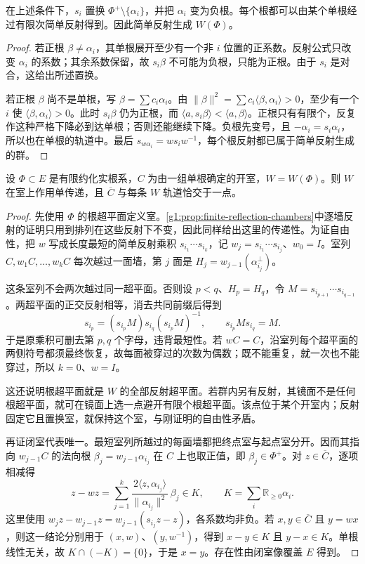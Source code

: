 \begin{lemma}\label{g1:lem:simple-reflection-positive-roots}
	在上述条件下，\(s_i\) 置换 \(\Phi^+\setminus\{\alpha_i\}\)，并把 \(\alpha_i\) 变为负根。每个根都可以由某个单根经过有限次简单反射得到。因此简单反射生成 \(W(\Phi)\)。
\end{lemma}
\begin{proof}
	若正根 \(\beta\ne\alpha_i\)，其单根展开至少有一个非 \(i\) 位置的正系数。反射公式只改变 \(\alpha_i\) 的系数；其余系数保留，故 \(s_i\beta\) 不可能为负根，只能为正根。由于 \(s_i\) 是对合，这给出所述置换。

	若正根 \(\beta\) 尚不是单根，写 \(\beta=\sum c_i\alpha_i\)。由
	\(\lVert\beta\rVert^2=\sum c_i\langle\beta,\alpha_i\rangle>0\)，至少有一个 \(i\) 使 \(\langle\beta,\alpha_i\rangle>0\)。此时 \(s_i\beta\) 仍为正根，而 \(\langle a,s_i\beta\rangle<\langle a,\beta\rangle\)。正根只有有限个，反复作这种严格下降必到达单根；否则还能继续下降。负根先变号，且 \(-\alpha_i=s_i\alpha_i\)，所以也在单根的轨道中。最后 \(s_{w\alpha_i}=ws_iw^{-1}\)，每个根反射都已属于简单反射生成的群。
\end{proof}

\begin{theorem}\label{g1:thm:reflection-chamber-fundamental}
	设 \(\Phi\subset E\) 是有限约化实根系，\(C\) 为由一组单根确定的开室，\(W=W(\Phi)\)。则 \(W\) 在室上作用单传递，且 \(\overline C\) 与每条 \(W\) 轨道恰交于一点。
\end{theorem}
\begin{proof}
	先使用 \(\Phi\) 的根超平面定义室。\cref{g1:prop:finite-reflection-chambers}中逐墙反射的证明只用到排列在这些反射下不变，因此同样给出这里的传递性。为证自由性，把 \(w\) 写成长度最短的简单反射乘积 \(s_{i_1}\cdots s_{i_k}\)，记 \(w_j=s_{i_1}\cdots s_{i_j}\)、\(w_0=I\)。室列 \(C,w_1C,\ldots,w_kC\) 每次越过一面墙，第 \(j\) 面是 \(H_j=w_{j-1}(\alpha_{i_j}^{\perp})\)。

	这条室列不会两次越过同一超平面。否则设 \(p<q\)、\(H_p=H_q\)，令 \(M=s_{i_{p+1}}\cdots s_{i_{q-1}}\)。两超平面的正交反射相等，消去共同前缀后得到
	\[
		s_{i_p}=(s_{i_p}M)s_{i_q}(s_{i_p}M)^{-1},
		\qquad s_{i_p}Ms_{i_q}=M.
	\]
	于是原乘积可删去第 \(p,q\) 个字母，违背最短性。若 \(wC=C\)，沿室列每个超平面的两侧符号都须最终恢复，故每面被穿过的次数为偶数；既不能重复，就一次也不能穿过，所以 \(k=0\)、\(w=I\)。

	这还说明根超平面就是 \(W\) 的全部反射超平面。若群内另有反射，其镜面不是任何根超平面，就可在镜面上选一点避开有限个根超平面。该点位于某个开室内；反射固定它且置换室，就保持这个室，与刚证明的自由性矛盾。

	再证闭室代表唯一。最短室列所越过的每面墙都把终点室与起点室分开。因而其指向 \(w_{j-1}C\) 的法向根
	\(\beta_j=w_{j-1}\alpha_{i_j}\)
	在 \(C\) 上也取正值，即 \(\beta_j\in\Phi^+\)。对 \(z\in\overline C\)，逐项相减得
	\[
		z-wz=\sum_{j=1}^k
		\frac{2\langle z,\alpha_{i_j}\rangle}{\lVert\alpha_{i_j}\rVert^2}\,\beta_j
		\in K,\qquad K=\sum_i\mathbb R_{\ge0}\alpha_i.
	\]
	这里使用 \(w_jz-w_{j-1}z=w_{j-1}(s_{i_j}z-z)\)，各系数均非负。若 \(x,y\in\overline C\) 且 \(y=wx\)，则这一结论分别用于 \((x,w)\)、\((y,w^{-1})\)，得到 \(x-y\in K\) 且 \(y-x\in K\)。单根线性无关，故 \(K\cap(-K)=\{0\}\)，于是 \(x=y\)。存在性由闭室像覆盖 \(E\) 得到。
\end{proof}


